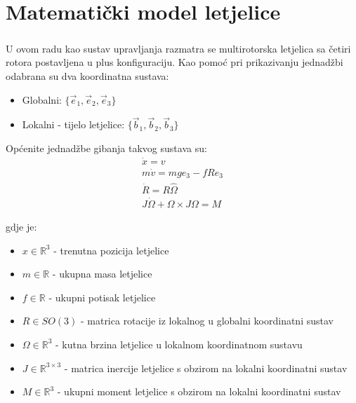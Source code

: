 \documentclass[times, utf8, diplomski, numeric]{fer}
\begin{document}
\chapter{Matematički model letjelice}

\paragraph{}U ovom radu kao sustav upravljanja razmatra se multirotorska letjelica sa četiri rotora postavljena u plus konfiguraciju. Kao pomoć pri prikazivanju jednadžbi odabrana su dva koordinatna sustava: 
\begin{itemize}
	\item Globalni: $\{\vec{e}_1, \vec{e}_2, \vec{e}_3\}$
	\item Lokalni - tijelo letjelice: $\{\vec{b}_1, \vec{b}_2, \vec{b}_3\}$
\end{itemize}

\noindent Općenite jednadžbe gibanja takvog sustava su:
\begin{gather}
	\dot{x} = v \\
	m \dot{v} = mge_3 - fRe_3 \label{thrust_dyn}\\
	\dot{R} = R\hat{\Omega} \label{model_ang} \\
	J\dot{\Omega} + \Omega \times J\Omega = M 
\end{gather}

gdje je:
\begin{itemize}
	\item $x \in \mathbb{R}^3$ - trenutna pozicija letjelice
	
	\item $m \in \mathbb{R}$ - ukupna masa letjelice
	
	\item $f \in \mathbb{R}$ - ukupni potisak letjelice 
	
	\item $R \in SO(3)$ - matrica rotacije iz lokalnog u globalni koordinatni sustav
	
	\item $\Omega \in \mathbb{R}^3$ - kutna brzina letjelice u lokalnom koordinatnom sustavu
	
	\item $J \in \mathbb{R}^{3\times3}$ - matrica inercije letjelice s obzirom na lokalni koordinatni sustav
	
	\item $M \in \mathbb{R}^3$ - ukupni moment letjelice s obzirom na lokalni koordinatni sustav
\end{itemize}
\end{document}
